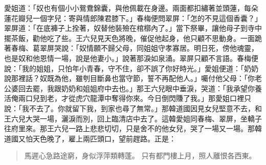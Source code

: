 愛姐道：「奴也有個小小鴛鴦錦囊，與他佩載在身邊。兩面都扣繡著並頭蓮，每朵蓮花瓣兒一個字兒：寄與情郎陳君膝下。」春梅便問翠屏：「怎的不見這個香囊？」翠屏道：「在底褲子上拴著，奴替他裝殮在棺槨內了。」當下祭畢，讓他母子到寺中擺茶飯，勸他吃了些。王六兒見天色將晚，催促他起身，他只顧不思動身。一面跪著春梅、葛翠屏哭說：「奴情願不歸父母，同姐姐守孝寡居。明日死，傍他魂靈，也是奴和他恩情一場，說是他妻小。」說著那淚如泉涌。翠屏只顧不言語。春梅便說：「我的姐姐，只怕年小青春，守不住，卻不誤了你好時光。」愛姐便道：「奶奶說那裡話？奴既為他，雖刳目斷鼻也當守節，誓不再配他人。」囑付他父母：「你老公婆回去罷，我跟奶奶和姐姐府中去也。」那王六兒眼中垂淚，哭道：「我承望你養活俺兩口兒到老，才從虎穴龍潭中奪得你來。今日倒閃賺了我。」那愛姐口裡只說：「我不去了。你就留下我，到家也尋了無常。」那韓道國因見女兒堅意不去，和王六兒大哭一場，灑淚而別，回上臨清店中去了。這韓愛姐同春梅、翠屏，坐轎子往府里來。那王六兒一路上悲悲切切，只是舍不的他女兒，哭了一場又一場。那韓道國又怕天色晚了，雇上兩匹頭口，望前趕路。正是：
\begin{quote}
馬遲心急路途窮，身似浮萍類轉蓬。
只有都門樓上月，照人離恨各西東。
\end{quote}

